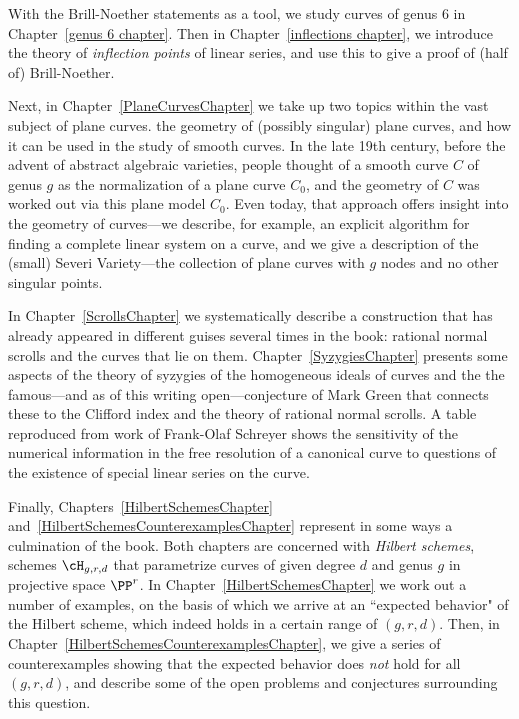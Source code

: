 With the Brill-Noether statements as a tool, we study curves of genus 6 in Chapter~\ref{genus 6 chapter}. 
Then in Chapter~\ref{inflections chapter}, we introduce the theory of \emph{inflection points} of linear series, and use this to give a proof of (half of) Brill-Noether.


Next, in Chapter~\ref{PlaneCurvesChapter} we take up two topics within the vast subject  of plane curves. the geometry of (possibly singular) plane curves, and how it can be used in the study of smooth curves. In the late 19th century, before the advent of abstract algebraic varieties, people thought of a smooth curve $C$ of genus $g$  as the normalization of a plane curve $C_0$, and the geometry of $C$ was worked out via this plane model $C_0$. Even today, that approach offers insight into the geometry of curves---we describe, for example, an explicit algorithm for finding a complete linear system on a curve, and we give a description of the 
(small) Severi Variety---the collection of plane curves with $g$ nodes and no other singular points.

In Chapter~\ref{ScrollsChapter} we systematically describe a construction that has already appeared in different guises several times in the book: rational normal scrolls and the curves that lie on them. Chapter~\ref{SyzygiesChapter} presents some aspects of the theory of syzygies of the homogeneous ideals of curves and the the famous---and as of this writing open---conjecture of Mark Green that connects these to the Clifford index and the theory of rational normal scrolls. A table reproduced from work of Frank-Olaf Schreyer shows the sensitivity of the numerical information in the free resolution of a canonical curve to questions of the existence of special linear series on the curve.

 Finally, Chapters~\ref{HilbertSchemesChapter} and~\ref{HilbertSchemesCounterexamplesChapter} represent in some ways a culmination of the book. Both chapters are concerned with \emph{Hilbert schemes}, schemes $\cH_{g,r,d}$ that parametrize curves of given degree $d$ and genus $g$ in projective space $\PP^r$. In Chapter~\ref{HilbertSchemesChapter} we work out a number of examples, on the basis of which we arrive at an ``expected behavior" of the Hilbert scheme, which indeed holds in a certain range of $(g,r,d)$. Then, in Chapter~\ref{HilbertSchemesCounterexamplesChapter}, we give a series of counterexamples showing that the expected behavior does \emph{not} hold for all $(g,r,d)$, and describe some of the open problems and conjectures surrounding this question.



